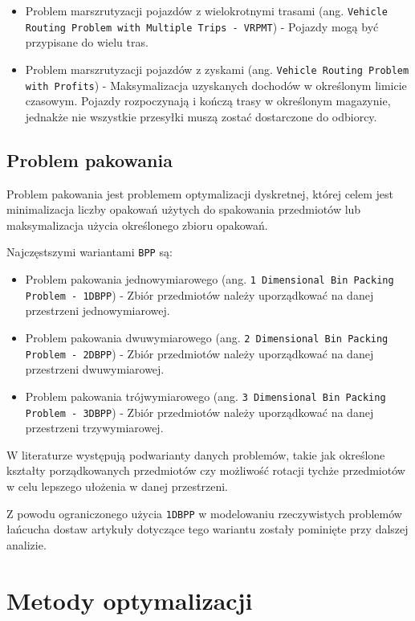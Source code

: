 \begin{itemize}
    \item Problem marszrutyzacji pojazdów z wielokrotnymi trasami (ang. \texttt{Vehicle Routing Problem with Multiple Trips - VRPMT}) - Pojazdy mogą być przypisane do wielu tras.
    \item Problem marszrutyzacji pojazdów z zyskami (ang. \texttt{Vehicle Routing Problem with Profits}) - Maksymalizacja uzyskanych dochodów w określonym limicie czasowym. Pojazdy rozpoczynają i kończą trasy w określonym magazynie, jednakże nie wszystkie przesyłki muszą zostać dostarczone do odbiorcy.
\end{itemize}

\subsection{Problem pakowania}

Problem pakowania jest problemem optymalizacji dyskretnej, której celem jest minimalizacja liczby opakowań użytych do spakowania przedmiotów lub maksymalizacja użycia określonego zbioru opakowań.

Najczęstszymi wariantami \texttt{BPP} są:
\begin{itemize}
    \item Problem pakowania jednowymiarowego (ang. \texttt{1 Dimensional Bin Packing Problem - 1DBPP}) - Zbiór przedmiotów należy uporządkować na danej przestrzeni jednowymiarowej.
    \item Problem pakowania dwuwymiarowego (ang. \texttt{2 Dimensional Bin Packing Problem - 2DBPP}) - Zbiór przedmiotów należy uporządkować na danej przestrzeni dwuwymiarowej.
    \item Problem pakowania trójwymiarowego (ang. \texttt{3 Dimensional Bin Packing Problem - 3DBPP}) - Zbiór przedmiotów należy uporządkować na danej przestrzeni trzywymiarowej.
\end{itemize}

W literaturze występują podwarianty danych problemów, takie jak określone kształty porządkowanych przedmiotów czy możliwość rotacji tychże przedmiotów w celu lepszego ułożenia w danej przestrzeni.

Z powodu ograniczonego użycia \texttt{1DBPP} w modelowaniu rzeczywistych problemów łańcucha dostaw artykuły dotyczące tego wariantu zostały pominięte przy dalszej analizie.

\section{Metody optymalizacji}


